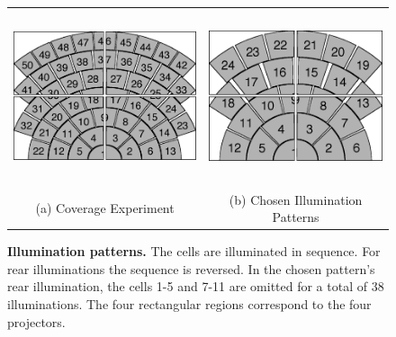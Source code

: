\begin{figure}
\centering
\begin{tabular}{cc}
\includegraphics[height=2in]{figures_cvpr/coverage_experiment_asplode.png} &
\includegraphics[height=2in]{figures_cvpr/final_cvpr_illuminations_asplode.png} \\
(a) Coverage Experiment & (b) Chosen Illumination Patterns
\end{tabular}\vspace{2mm}
\caption{{\bf Illumination patterns.}   The cells are illuminated in sequence.  For rear illuminations the sequence is reversed.  In the chosen pattern's rear illumination, the cells 1-5 and 7-11 are omitted for a total of 38 illuminations. The four rectangular regions correspond to the four projectors.\vspace{0mm}}
\label{fig:illumination-patterns}
\end{figure}
